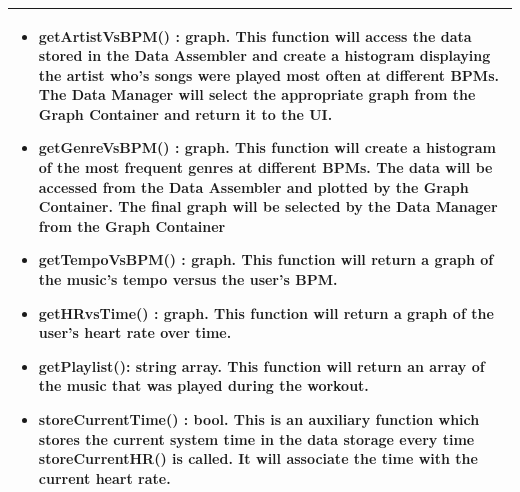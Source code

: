\documentclass[letterpaper,english, 12pt]{scrreprt}
\begin{document}
\begin{center}
\begin{tabular}{|C{15cm}|}
\begin{itemize}
                                        \item getArtistVsBPM() : graph. This function will access the data stored in the Data Assembler and create a histogram displaying the artist who's songs were played most often at different BPMs. The Data Manager will select the appropriate graph from the Graph Container and return it to the UI.
                                        \item getGenreVsBPM() : graph. This function will create a histogram of the most frequent genres at different BPMs. The data will be accessed from the Data Assembler and plotted by the Graph Container. The final graph will be selected by the Data Manager from the Graph Container
                                        \item getTempoVsBPM() : graph. This function will return a graph of the music's tempo versus the user's BPM.
                                        \item getHRvsTime() : graph. This function will return a graph of the user's heart rate over time.
                                        \item getPlaylist(): string array. This function will return an array of the music that was played during the workout.
                                        \item storeCurrentTime() : bool. This is an auxiliary function which stores the current system time in the data storage every time storeCurrentHR() is called. It will associate the time with the current heart rate.
                                \end{itemize}\\
                        \hline
        \end{tabular}
\end{center}
\end{document}
